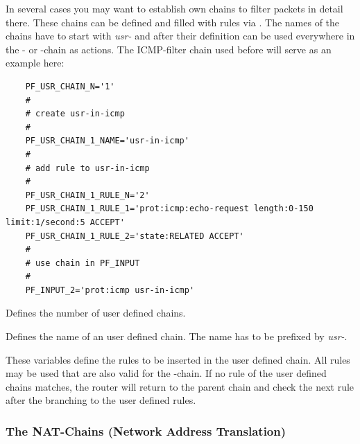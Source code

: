 
In several cases you may want to establish own chains to filter packets
in detail there. These chains can be defined and filled with rules via 
. The names of the chains have to start with 
\emph{usr-} and after their definition can be used everywhere in the 
- or -chain as actions. The ICMP-filter 
chain used before will serve as an example here:

\begin{example}
{\footnotesize
\begin{verbatim}
    PF_USR_CHAIN_N='1'
    #
    # create usr-in-icmp
    #
    PF_USR_CHAIN_1_NAME='usr-in-icmp'
    #
    # add rule to usr-in-icmp
    #
    PF_USR_CHAIN_1_RULE_N='2'
    PF_USR_CHAIN_1_RULE_1='prot:icmp:echo-request length:0-150 limit:1/second:5 ACCEPT'
    PF_USR_CHAIN_1_RULE_2='state:RELATED ACCEPT'
    #
    # use chain in PF_INPUT
    #
    PF_INPUT_2='prot:icmp usr-in-icmp'
\end{verbatim}}
\end{example}

\begin{description}
 Defines the number
of user defined chains.

Defines the name of an user defined chain. The name has to be prefixed by
\emph{usr-}.

These variables define the rules to be inserted in the user defined chain.
All rules may be used that are also valid for the -chain.
If no rule of the user defined chains matches, the router will return to
the parent chain and check the next rule after the branching to
the user defined rules.
\end{description}

\subsubsection{The NAT-Chains (Network Address Translation)}

